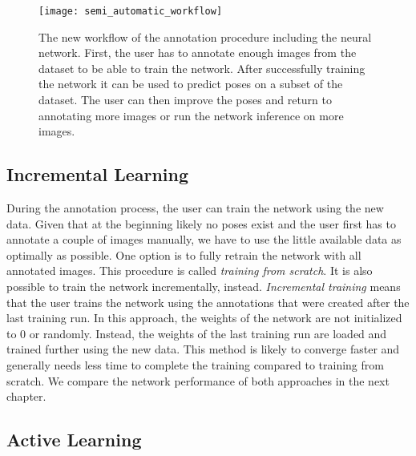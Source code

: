 \begin{figure}[!tbp]
	\centering
    \texttt{[image: semi\_automatic\_workflow]}
    \caption{The new workflow of the annotation procedure including the neural network. First, the user has to annotate enough images from the dataset to be able to train the network. After successfully training the network it can be used to predict poses on a subset of the dataset. The user can then improve the poses and return to annotating more images or run the network inference on more images.}
    	\label{fig:semi_automatic_workflow}
\end{figure}

\subsection{Incremental Learning} \label{subsection:online_learning}

During the annotation process, the user can train the network using the new data. Given that at the beginning likely no poses exist and the user first has to annotate a couple of images manually, we have to use the little available data as optimally as possible. One option is to fully retrain the network with all  annotated images. This procedure is called \textit{training from scratch}. It is also possible to train the network incrementally, instead. \textit{Incremental training} means that the user trains the network using the annotations that were created after the last training run. In this approach, the weights of the network are not initialized to 0 or randomly. Instead, the weights of the last training run are loaded and trained further using the new data. This method is likely to converge faster and generally needs less time to complete the training compared to training from scratch. We compare the network performance of both approaches in the next chapter.

\subsection{Active Learning} \label{subsection:active_learning}

